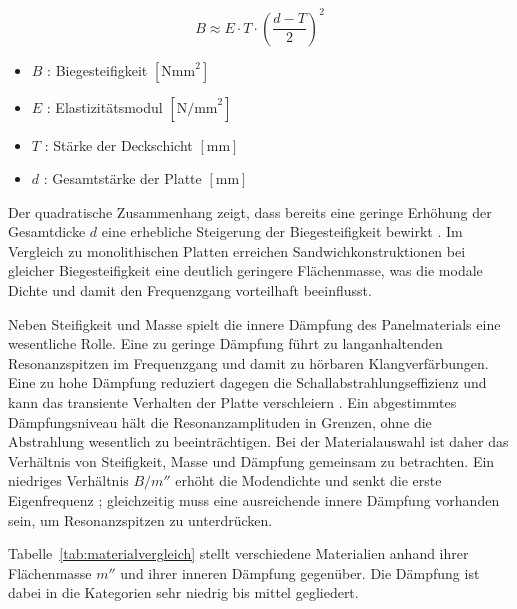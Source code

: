 \begin{equation}
B \approx E \cdot T \cdot \left(\frac{d-T}{2}\right)^2
\label{eq:biegesteifigkeit}
\end{equation}

\begin{itemize}
    \item $B$ : Biegesteifigkeit $[\text{Nmm}^2]$
    \item $E$ : Elastizitätsmodul $[\text{N/mm}^2]$
    \item $T$ : Stärke der Deckschicht $[\text{mm}]$
    \item $d$ : Gesamtstärke der Platte $[\text{mm}]$
\end{itemize}

Der quadratische Zusammenhang zeigt, dass bereits eine geringe Erhöhung der Gesamtdicke $d$ eine erhebliche Steigerung der Biegesteifigkeit bewirkt \cite{Wiedemann2006}. Im Vergleich zu monolithischen Platten erreichen Sandwichkonstruktionen bei gleicher Biegesteifigkeit eine deutlich geringere Flächenmasse, was die modale Dichte und damit den Frequenzgang vorteilhaft beeinflusst.

Neben Steifigkeit und Masse spielt die innere Dämpfung des Panelmaterials eine wesentliche Rolle. Eine zu geringe Dämpfung führt zu langanhaltenden Resonanzspitzen im Frequenzgang und damit zu hörbaren Klangverfärbungen. Eine zu hohe Dämpfung reduziert dagegen die Schallabstrahlungseffizienz und kann das transiente Verhalten der Platte verschleiern \cite{Moeser2010}. Ein abgestimmtes Dämpfungsniveau hält die Resonanzamplituden in Grenzen, ohne die Abstrahlung wesentlich zu beeinträchtigen. Bei der Materialauswahl ist daher das Verhältnis von Steifigkeit, Masse und Dämpfung gemeinsam zu betrachten. Ein niedriges Verhältnis $B/m''$ erhöht die Modendichte und senkt die erste Eigenfrequenz \cite{Moeser2010}; gleichzeitig muss eine ausreichende innere Dämpfung vorhanden sein, um Resonanzspitzen zu unterdrücken.

Tabelle~\ref{tab:materialvergleich} stellt verschiedene Materialien anhand ihrer Flächenmasse $m''$ und ihrer inneren Dämpfung gegenüber. Die Dämpfung ist dabei in die Kategorien \glqq sehr niedrig\grqq{} bis \glqq mittel\grqq{} gegliedert.

